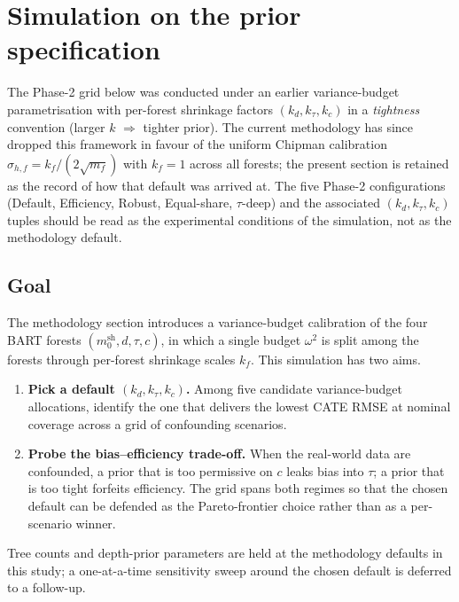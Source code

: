 \documentclass[11pt]{article}
\theoremstyle{plain}
\theoremstyle{definition}
\theoremstyle{remark}
\newcommand{\1}{\mathds{1}}
\begin{document}
\section{Simulation on the prior specification}
\label{sec:sim-prior}

\begin{remark}
The Phase-2 grid below was conducted under an earlier variance-budget
parametrisation with per-forest shrinkage factors $(k_d, k_\tau, k_c)$ in
a \emph{tightness} convention (larger $k$ $\Rightarrow$ tighter prior).
The current methodology has since dropped this framework in favour of the
uniform Chipman calibration $\sigma_{h,f} = k_f/(2\sqrt{m_f})$ with
$k_f = 1$ across all forests; the present section is retained as the
record of how that default was arrived at.
The five Phase-2 configurations (Default, Efficiency, Robust, Equal-share,
$\tau$-deep) and the associated $(k_d, k_\tau, k_c)$ tuples should be read
as the experimental conditions of the simulation, not as the methodology
default.
\end{remark}

\subsection{Goal}
\label{sec:sim-prior-goal}

The methodology section introduces a variance-budget calibration of the four
BART forests $(m_0^{\mathrm{sh}}, d, \tau, c)$, in which a single budget $\omega^2$
is split among the forests through per-forest shrinkage scales $k_f$. This
simulation has two aims.
\begin{enumerate}
  \item \textbf{Pick a default $(k_d, k_\tau, k_c)$.} Among five candidate
    variance-budget allocations, identify the one that delivers the lowest
    CATE RMSE at nominal coverage across a grid of confounding scenarios.
  \item \textbf{Probe the bias--efficiency trade-off.} When the real-world
    data are confounded, a prior that is too permissive on $c$ leaks bias
    into $\tau$; a prior that is too tight forfeits efficiency. The grid
    spans both regimes so that the chosen default can be defended as the
    Pareto-frontier choice rather than as a per-scenario winner.
\end{enumerate}
Tree counts and depth-prior parameters are held at the methodology defaults
in this study; a one-at-a-time sensitivity sweep around the chosen default
is deferred to a follow-up.
\end{document}
